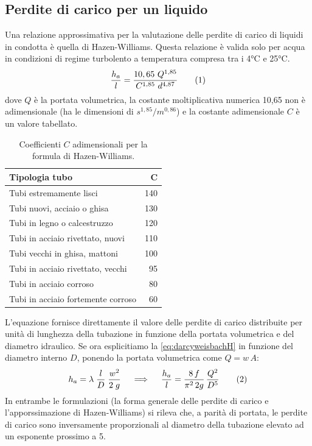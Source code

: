\subsection{Perdite di carico per un liquido}
Una relazione approssimativa per la valutazione delle perdite di carico di liquidi in condotta è quella di Hazen-Williams.  Questa relazione è valida solo per acqua in condizioni di regime turbolento a temperatura compresa tra i 4°C e 25°C.
\[\frac{h_a}{l} = \frac{10,65\ Q^{1,85}}{C^{1,85}\ d^{4,87}} \addtag \label{eq:HW}\]
dove \(Q\) è la portata volumetrica, la costante moltiplicativa numerica 10,65 non è adimensionale (ha le dimensioni di \(s^{1,85}/m^{0,86}\)) e la costante adimensionale \(C\) è un valore tabellato.
\begin{table}[htbp]
    \small
    \centering
    \begin{tabular}{|l|r|}
        \hline
        \textbf{Tipologia tubo} & \(\mathbf{C}\)\\
        \hline
             Tubi estremamente lisci & 140\\
        Tubi nuovi, acciaio o ghisa & 130\\
        Tubi in legno o calcestruzzo & 120\\
        Tubi in acciaio rivettato, nuovi & 110\\
        Tubi vecchi in ghisa, mattoni & 100\\
        Tubi in acciaio rivettato, vecchi & 95\\
        Tubi in acciaio corroso & 80\\
        Tubi in acciaio fortemente corroso & 60\\
        \hline
    \end{tabular}
    \label{tab:coefficientiHZ}
    \caption{Coefficienti $C$ adimensionali per la formula di Hazen-Williams.}
\end{table}
L'equazione fornisce direttamente il valore delle perdite di carico distribuite per unità di lunghezza della tubazione in funzione della portata volumetrica e del diametro idraulico. Se ora esplicitiamo la \eqref{eq:darcyweisbachH} in funzione del diametro interno \(D\), ponendo la portata volumetrica come \(Q=w \, A\):
\[h_a = \lambda \; \frac{l}{D} \; \frac{w^2}{2 \; g} \quad \implies \quad \frac{h_a}{l}=\frac{8 \, f}{\pi^2 \, 2g} \, \frac{Q^2}{D^5} \addtag \label{eq:darcyweisbachespl} \]
In entrambe le formulazioni (la forma generale delle perdite di carico e l'apporssimazione di Hazen-Williams) si rileva che, a parità di portata, le perdite di carico sono inversamente proporzionali al diametro della tubazione elevato ad un esponente prossimo a 5.

